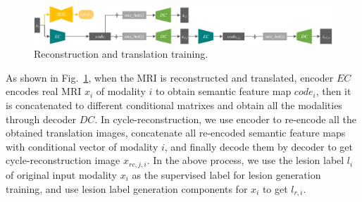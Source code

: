\documentclass{ecai}
\begin{document}
\begin{figure}
	\centering
	\includegraphics[width=1.75\columnwidth]{figures/trans_train}
	\caption{Reconstruction and translation training.}
	\label{trans_train}
\end{figure}

As shown in Fig.~\ref{trans_train}, when the MRI is reconstructed and translated, encoder $EC$ encodes real MRI $x_i$ of modality $i$ to obtain semantic feature map $code_{i}$, then it is concatenated to different conditional matrixes and obtain all the modalities through decoder $DC$. In cycle-reconstruction, we use encoder to re-encode all the obtained translation images, concatenate all re-encoded semantic feature maps with conditional vector of modality $i$, and finally decode them by decoder to get cycle-reconstruction image $x_{rc,j,i}$. In the above process, we use the lesion label $l_i$ of original input modality $x_i$ as the supervised label for lesion generation training, and use lesion label generation components for $x_i$ to get $l_{r,i}$.
\end{document}
